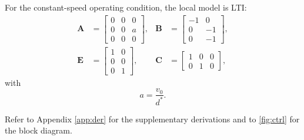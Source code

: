 For the constant-speed operating condition, the local model is LTI:
\begin{equation}
\begin{aligned}
\mathbf{A}
&=
\begin{bmatrix}
0&0&0\\
0&0&a\\
0&0&0
\end{bmatrix},
&
\mathbf{B}
&=
\begin{bmatrix}
-1&0\\
0&-1\\
0&-1
\end{bmatrix},\\[6pt]
\mathbf{E}
&=
\begin{bmatrix}
1&0\\
0&0\\
0&1
\end{bmatrix},
&
\mathbf{C}
&=
\begin{bmatrix}
1&0&0\\
0&1&0
\end{bmatrix},
\end{aligned}
\label{eq:mats}
\end{equation}
with
\[
a=\frac{v_0}{d^\ast}.
\]


Refer to Appendix \ref{app:der} for the supplementary derivations and to \autoref{fig:ctrl} for the block diagram. 

